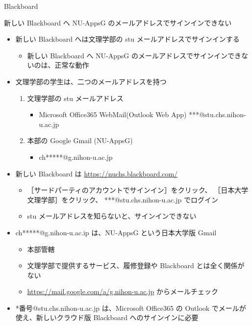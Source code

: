 \documentclass[a4j,10pt]{jsarticle}
\begin{document}
{\begin{frame}[label={sec:org166405d},fragile]{Blackboard}
\begin{block}{新しい Blackboard へ NU-AppsG のメールアドレスでサインインできない}
\par
\begin{itemize}
\item 新しい Blackboard へは文理学部の stu メールアドレスでサインインする
\begin{itemize}
\item 新しい Blackboard へ NU-AppsG のメールアドレスでサインインできないのは、正常な動作
\end{itemize}
\par
\item 文理学部の学生は、二つのメールアドレスを持つ
\begin{enumerate}
\item 文理学部の stu メールアドレス
\begin{itemize}
\item Microsoft Office365 WebMail(Outlook Web App) ***@stu.chs.nihon-u.ac.jp
\end{itemize}
\item 本部の Google Gmail (NU-AppsG)
\begin{itemize}
\item ch*****@g.nihon-u.ac.jp
\end{itemize}
\end{enumerate}
\par
\item 新しい Blackboard は \url{https://nuchs.blackboard.com/}
\begin{itemize}
\item ［サードパーティのアカウントでサインイン］をクリック、 ［日本大学文理学部］をクリック、 ***@stu.chs.nihon-u.ac.jp でログイン
\item stu メールアドレスを知らないと、サインインできない
\end{itemize}
\end{itemize}
\par
\begin{itemize}
\item ch*****@g.nihon-u.ac.ip は、NU-AppsG という日本大学版 Gmail
\begin{itemize}
\item 本部管轄
\item 文理学部で提供するサービス、履修登録や Blackboard とは全く関係がない
\item \url{https://mail.google.com/a/g.nihon-u.ac.jp} からメールチェック
\end{itemize}
\par
\item *番号@stu.chs.nihon-u.ac.jp は、Microsoft Office365 の Outlook でメールが使え、新しいクラウド版 Blackboard へのサインインに必要

\end{itemize}
\end{block}
\end{frame}}
\end{document}
